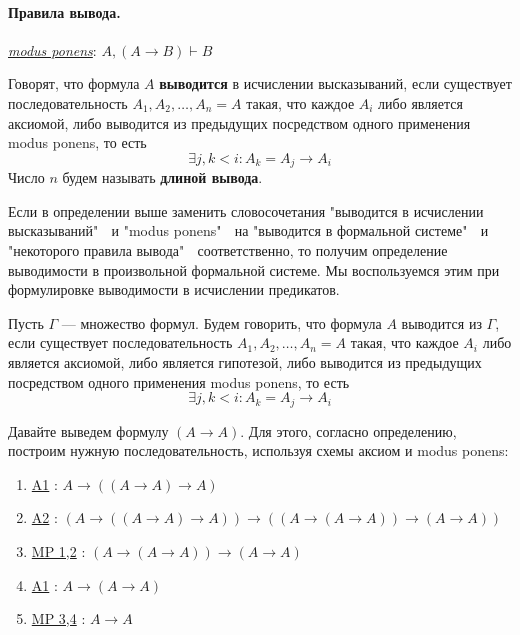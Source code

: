 \documentclass[11pt]{article}
\begin{document}
\paragraph{Правила вывода.} 
\underline{\textit{modus ponens}}: $A, (A \to B) \vdash B$

\begin{definition}[Выводимость]
    Говорят, что формула $A$ \textbf{выводится} в исчислении высказываний, если 
    существует последовательность $A_1, A_2, \ldots, A_n = A$ такая, что каждое $A_i$ либо является аксиомой, либо выводится из предыдущих посредством одного применения modus ponens, то есть 
    \[\exists j, k < i: A_k = A_j \to A_i\]
    Число $n$ будем называть \textbf{длиной вывода}.
\end{definition}

\begin{remark}
    Если в определении выше заменить словосочетания "выводится в исчислении высказываний" $\;$ и "modus ponens" $\;$ на "выводится в формальной системе" $\;$ и "некоторого правила вывода" $\;$ соответственно, 
    то получим определение выводимости в произвольной формальной системе. Мы воспользуемся этим при формулировке выводимости в исчислении предикатов.
\end{remark}

\begin{definition}
    Пусть $\Gamma$ --- множество формул. Будем говорить, что формула $A$ выводится из $\Gamma$, если 
    существует последовательность $A_1, A_2, \ldots, A_n = A$ такая, что каждое $A_i$ либо является аксиомой, либо является гипотезой, либо выводится из предыдущих посредством одного применения modus ponens, то есть 
    \[\exists j, k < i: A_k = A_j \to A_i\]
\end{definition}

\begin{example}
    Давайте выведем формулу $(A \to A)$. Для этого, согласно определению, построим нужную последовательность, используя схемы аксиом и modus ponens:
    \begin{enumerate}
        \item \underline{\textnormal{A1}} \textnormal{:} $A \to ((A \to A) \to A)$
        \item \underline{\textnormal{A2}} \textnormal{:} $(A \to ((A \to A) \to A)) \to ((A \to (A \to A)) \to (A \to A))$
        \item \underline{\textnormal{MP 1,2}} \textnormal{:} $(A \to (A \to A)) \to (A \to A)$
        \item \underline{\textnormal{A1}} \textnormal{:} $A \to (A \to A)$
        \item \underline{\textnormal{MP 3,4}} \textnormal{:} $A \to A$
    \end{enumerate}
\end{example}
\end{document}
